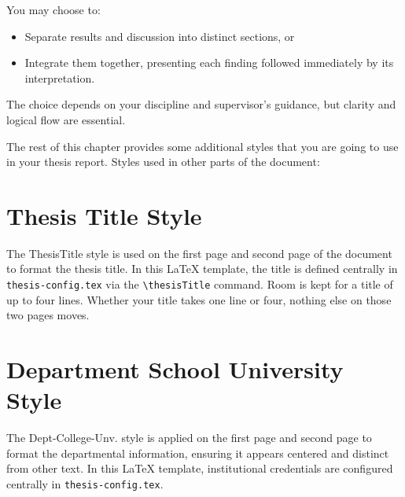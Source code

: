 You may choose to:
\begin{itemize}
  \item Separate results and discussion into distinct sections, or
  \item Integrate them together, presenting each finding followed immediately by its interpretation.
\end{itemize}
The choice depends on your discipline and supervisor's guidance, but clarity and logical flow are essential.

The rest of this chapter provides some additional styles that you are going to use in your thesis report. Styles used in other parts of the document:

\section{Thesis Title Style}
\label{sec:thesis-title-style}

The ThesisTitle style is used on the first page and second page of the document to format the thesis title. In this \LaTeX{} template, the title is defined centrally in \texttt{thesis-config.tex} via the \texttt{\textbackslash thesisTitle} command. Room is kept for a title of up to four lines. Whether your title takes one line or four, nothing else on those two pages moves.

\section{Department School University Style}
\label{sec:dept-school-univ-style}

The Dept-College-Unv. style is applied on the first page and second page to format the departmental information, ensuring it appears centered and distinct from other text. In this \LaTeX{} template, institutional credentials are configured centrally in \texttt{thesis-config.tex}.
